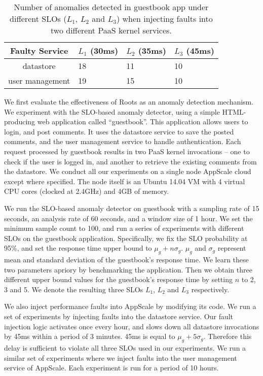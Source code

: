 \begin{table}
\begin{center}
\begin{tabular}{|c|p{1cm}|p{1cm}|p{1cm}|}
\hline
Faulty Service & $L_1$ (30ms) & $L_2$ (35ms) & $L_3$ (45ms) \\ \hline
datastore & 18 & 11 & 10 \\ \hline
user management & 19 & 15 & 10 \\ \hline
\end{tabular}
\end{center}
\caption{Number of anomalies detected in guestbook app under different SLOs 
($L_1$, $L_2$ and $L_3$) when injecting faults into two different PaaS kernel services.
\label{tab:anomaly_counts}
}
\end{table}

We first evaluate the effectiveness of Roots as an anomaly detection mechanism. We experiment with
the SLO-based anomaly detector, using a simple HTML-producing web application called ``guestbook''.
This application allows users to login, and post comments. It uses the datastore service to save
the posted comments, and the user management service to handle authentication. Each request processed
by guestbook results in two PaaS kernel invocations -- one to check if the user is logged in, and 
another to retrieve the existing comments from the datastore. We conduct all
our experiments on a single node AppScale cloud except where specified. The node itself is an Ubuntu
14.04 VM with 4 virtual CPU cores (clocked at 2.4GHz) and 4GB of memory.

We run the SLO-based anomaly detector on guestbook with a sampling rate of 15 seconds, an analysis
rate of 60 seconds, and a window size of 1 hour. We set the minimum sample count to 100, and
run a series of experiments with different SLOs on the guestbook application. Specifically, we fix
the SLO probability at 95\%, and set the response time upper bound to $\mu_g + n\sigma_g$. 
$\mu_g$ and $\sigma_g$ represent mean and standard deviation of the
guestbook's response time. We learn these two parameters apriory by benchmarking
the application. Then we obtain three different upper bound values for the guestbook's
response time by setting 
$n$ to 2, 3 and 5. We denote the resulting three SLOs $L_1$, $L_2$ and $L_3$ respectively.

We also inject performance faults into AppScale by modifying its code. We run a set of experiments
by injecting faults into the datastore service. Our fault injection logic activates once every hour, and
slows down all datastore invocations by 45ms within a period of 3 minutes. 45ms is equal 
to $\mu_g + 5\sigma_g$. Therefore this delay is sufficient to violate all three SLOs used in our experiments. 
We run a similar set of experiments where we inject faults into the user management service of
AppScale. Each experiment is run for a period of 10 hours.

